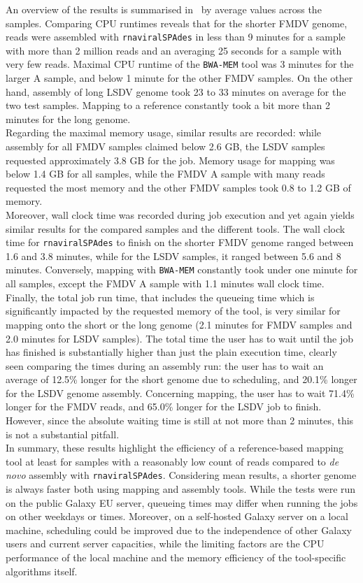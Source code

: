 An overview of the results is summarised in~ by average values across the samples. Comparing CPU runtimes reveals that for the shorter \ac{FMDV} genome, reads were assembled with \texttt{rnaviralSPAdes} in less than 9 minutes for a sample with more than 2 million reads and an averaging 25 seconds for a sample with very few reads. Maximal CPU runtime of the \texttt{BWA-MEM} tool was 3 minutes for the larger A sample, and below 1 minute for the other \ac{FMDV} samples. On the other hand, assembly of long \ac{LSDV} genome took 23 to 33 minutes on average for the two test samples. Mapping to a reference constantly took a bit more than 2 minutes for the long genome.\\
Regarding the maximal memory usage, similar results are recorded: while assembly for all \ac{FMDV} samples claimed below 2.6 GB, the \ac{LSDV} samples requested approximately 3.8 GB for the job. Memory usage for mapping was below 1.4 GB for all samples, while the \ac{FMDV} A sample with many reads requested the most memory and the other \ac{FMDV} samples took 0.8 to 1.2 GB of memory.\\
Moreover, wall clock time was recorded during job execution and yet again yields similar results for the compared samples and the different tools. The wall clock time for \texttt{rnaviralSPAdes} to finish on the shorter \ac{FMDV} genome ranged between 1.6 and 3.8 minutes, while for the \ac{LSDV} samples, it ranged between 5.6 and 8 minutes. Conversely, mapping with \texttt{BWA-MEM} constantly took under one minute for all samples, except the \ac{FMDV} A sample with 1.1 minutes wall clock time.\\
Finally, the total job run time, that includes the queueing time which is significantly impacted by the requested memory of the tool, is very similar for mapping onto the short or the long genome (2.1 minutes for \ac{FMDV} samples and 2.0 minutes for \ac{LSDV} samples). The total time the user has to wait until the job has finished is substantially higher than just the plain execution time, clearly seen comparing the times during an assembly run: the user has to wait an average of 12.5\% longer for the short genome due to scheduling, and 20.1\% longer for the \ac{LSDV} genome assembly. Concerning mapping, the user has to wait 71.4\% longer for the \ac{FMDV} reads, and 65.0\% longer for the \ac{LSDV} job to finish. However, since the absolute waiting time is still at not more than 2 minutes, this is not a substantial pitfall.\\
In summary, these results highlight the efficiency of a reference-based mapping tool at least for samples with a reasonably low count of reads compared to \textit{de novo} assembly with \texttt{rnaviralSPAdes}. Considering mean results, a shorter genome is always faster both using mapping and assembly tools. While the tests were run on the public Galaxy EU server, queueing times may differ when running the jobs on other weekdays or times. Moreover, on a self-hosted Galaxy server on a local machine, scheduling could be improved due to the independence of other Galaxy users and current server capacities, while the limiting factors are the CPU performance of the local machine and the memory efficiency of the tool-specific algorithms itself.
